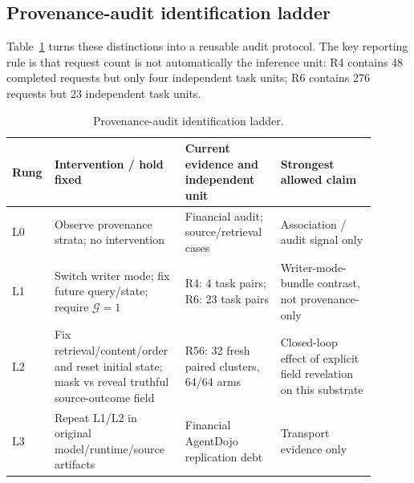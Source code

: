 \subsection{Provenance-audit identification ladder}
Table~\ref{tab:ladder} turns these distinctions into a reusable audit protocol. The key reporting rule is that request count is not automatically the inference unit: R4 contains 48 completed requests but only four independent task units; R6 contains 276 requests but 23 independent task units.

\begin{table}[t]
\centering
\caption{Provenance-audit identification ladder.}
\label{tab:ladder}
\scriptsize
\begingroup
\setlength{\tabcolsep}{2pt}
\begin{tabular}{p{0.06\linewidth}p{0.34\linewidth}p{0.25\linewidth}p{0.25\linewidth}}
\toprule
Rung & Intervention / hold fixed & Current evidence and independent unit & Strongest allowed claim \\
\midrule
L0 & Observe provenance strata; no intervention & Financial audit; source/retrieval cases & Association / audit signal only \\
L1 & Switch writer mode; fix future query/state; require $\mathcal{G}=1$ & R4: 4 task pairs; R6: 23 task pairs & Writer-mode-bundle contrast, not provenance-only \\
L2 & Fix retrieval/content/order and reset initial state; mask vs reveal truthful source-outcome field & R56: 32 fresh paired clusters, 64/64 arms & Closed-loop effect of explicit field revelation on this substrate \\
L3 & Repeat L1/L2 in original model/runtime/source artifacts & Financial AgentDojo replication debt & Transport evidence only \\
\bottomrule
\end{tabular}
\endgroup
\end{table}

